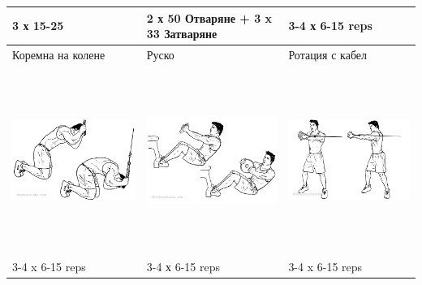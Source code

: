 \documentclass{article}
\begin{document}
\begin{tabular}{ | m{5cm} | m{5cm} | m{5cm} | }
3 х 15-25  &  2 х 50 Отваряне + 3 x 33 Затваряне & 3-4 х 6-15 reps \\ 
\hline
 Коремна на колене & Руско & Ротация с кабел \\ 
\begin{minipage}{5cm} \includegraphics[width=\linewidth, height=60mm]{Kneeling_Cable_Crunch.png} \end{minipage} &
\begin{minipage}{5cm} \includegraphics[width=\linewidth, height=60mm]{Russian_Twist.png} \end{minipage} & 
\begin{minipage}{5cm} \includegraphics[width=\linewidth, height=60mm]{Cable_Core_Rotation.png} \end{minipage} \\
 3-4 x 6-15 reps & 3-4 х 6-15 reps & 3-4 x 6-15 reps \\ 
\hline
\end{tabular}
\end{document}
